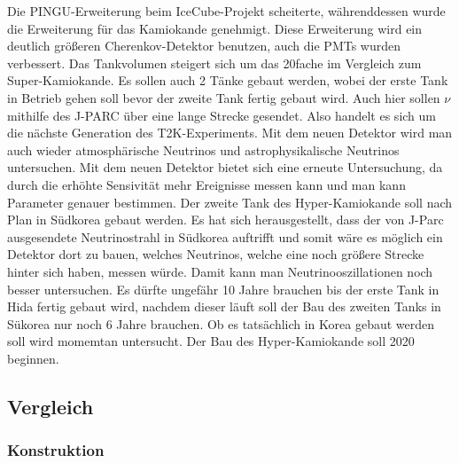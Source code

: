 Die PINGU-Erweiterung beim IceCube-Projekt scheiterte, währenddessen wurde die Erweiterung für das Kamiokande genehmigt. 
Diese Erweiterung wird ein deutlich größeren Cherenkov-Detektor benutzen, auch die PMTs wurden verbessert. Das Tankvolumen
steigert sich um das 20fache im Vergleich zum Super-Kamiokande. Es sollen auch 2 Tänke gebaut werden, wobei der erste
Tank in Betrieb gehen soll bevor der zweite Tank fertig gebaut wird.
Auch hier sollen $\nu$ mithilfe des J-PARC über eine lange Strecke gesendet. Also handelt es sich um die nächste
Generation des T2K-Experiments. Mit dem neuen Detektor wird man auch wieder atmosphärische Neutrinos und astrophysikalische
Neutrinos untersuchen. 
Mit dem neuen Detektor bietet sich eine erneute Untersuchung, da durch die
erhöhte Sensivität mehr Ereignisse messen kann und man kann Parameter genauer bestimmen.
Der zweite Tank des Hyper-Kamiokande soll nach Plan in Südkorea gebaut werden. Es hat sich herausgestellt, dass
der von J-Parc ausgesendete Neutrinostrahl in Südkorea auftrifft und somit wäre es möglich ein
Detektor dort zu bauen, welches Neutrinos, welche eine noch größere Strecke hinter sich haben,
messen würde. Damit kann man Neutrinooszillationen noch besser untersuchen.  
Es dürfte ungefähr 10 Jahre brauchen bis der erste Tank in Hida fertig gebaut wird, nachdem dieser läuft 
soll der Bau des zweiten Tanks in Sükorea nur noch 6 Jahre brauchen. Ob es tatsächlich in Korea gebaut werden
soll wird momemtan untersucht. \cite{Lodovico2017}
Der Bau des Hyper-Kamiokande soll 2020 beginnen. \cite{HyperK2018}

\subsection{Vergleich}

\subsubsection{Konstruktion}

